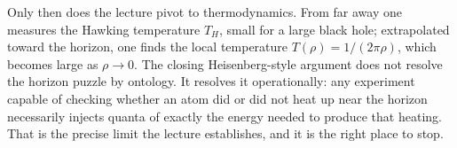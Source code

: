 Only then does the lecture pivot to thermodynamics. From far away one measures the Hawking temperature \(T_H\), small for a large black hole; extrapolated toward the horizon, one finds the local temperature \(T(\rho)=1/(2\pi\rho)\), which becomes large as \(\rho\to 0\). The closing Heisenberg-style argument does not resolve the horizon puzzle by ontology. It resolves it operationally: any experiment capable of checking whether an atom did or did not heat up near the horizon necessarily injects quanta of exactly the energy needed to produce that heating. That is the precise limit the lecture establishes, and it is the right place to stop.